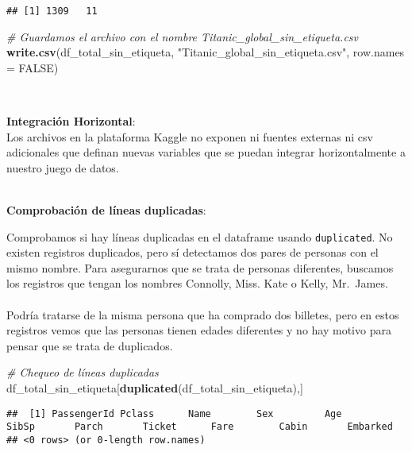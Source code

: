 \documentclass[
]{article}
\newenvironment{Shaded}{\begin{snugshade}}{\end{snugshade}}
\newcommand{\CommentTok}[1]{\textcolor[rgb]{0.56,0.35,0.01}{\textit{#1}}}
\newcommand{\DataTypeTok}[1]{\textcolor[rgb]{0.13,0.29,0.53}{#1}}
\newcommand{\KeywordTok}[1]{\textcolor[rgb]{0.13,0.29,0.53}{\textbf{#1}}}
\newcommand{\NormalTok}[1]{#1}
\newcommand{\OtherTok}[1]{\textcolor[rgb]{0.56,0.35,0.01}{#1}}
\newcommand{\StringTok}[1]{\textcolor[rgb]{0.31,0.60,0.02}{#1}}
\begin{document}
\begin{verbatim}
## [1] 1309   11
\end{verbatim}

\begin{Shaded}
\begin{Highlighting}[]
\CommentTok{# Guardamos el archivo con el nombre Titanic_global_sin_etiqueta.csv}
\KeywordTok{write.csv}\NormalTok{(df_total_sin_etiqueta, }\StringTok{"Titanic_global_sin_etiqueta.csv"}\NormalTok{, }\DataTypeTok{row.names =} \OtherTok{FALSE}\NormalTok{)}
\end{Highlighting}
\end{Shaded}

\texttt{}~\\
\texttt{}

\textbf{Integración Horizontal}: \texttt{}\\
Los archivos en la plataforma Kaggle no exponen ni fuentes externas ni
csv adicionales que definan nuevas variables que se puedan integrar
horizontalmente a nuestro juego de datos.\\
\texttt{}~\\
\texttt{}

\textbf{Comprobación de líneas duplicadas}:

\texttt{}

Comprobamos si hay líneas duplicadas en el dataframe usando
\texttt{duplicated}. No existen registros duplicados, pero sí detectamos
dos pares de personas con el mismo nombre. Para asegurarnos que se trata
de personas diferentes, buscamos los registros que tengan los nombres
Connolly, Miss. Kate o Kelly, Mr.~James.\\
\texttt{}~\\
Podría tratarse de la misma persona que ha comprado dos billetes, pero
en estos registros vemos que las personas tienen edades diferentes y no
hay motivo para pensar que se trata de duplicados.\\
\texttt{}

\begin{Shaded}
\begin{Highlighting}[]
\CommentTok{# Chequeo de líneas duplicadas}
\NormalTok{df_total_sin_etiqueta[}\KeywordTok{duplicated}\NormalTok{(df_total_sin_etiqueta),]}
\end{Highlighting}
\end{Shaded}

\begin{verbatim}
##  [1] PassengerId Pclass      Name        Sex         Age         SibSp       Parch       Ticket      Fare        Cabin       Embarked   
## <0 rows> (or 0-length row.names)
\end{verbatim}
\end{document}
